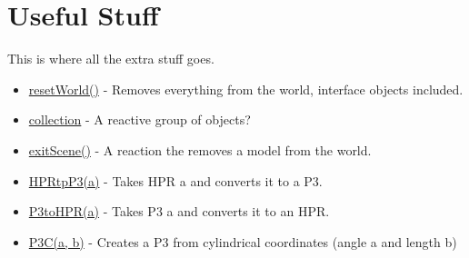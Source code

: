 \documentclass[10pt]{article}
\begin{document}
\section*{Useful Stuff}
This is where all the extra stuff goes.
\begin{itemize}
    \item \underline{resetWorld()} - Removes everything from the world, interface objects included.
    \item \underline{collection} - A reactive group of objects?
    \item \underline{exitScene()} - A reaction the removes a model from the world.
    \item \underline{HPRtpP3(a)} - Takes HPR a and converts it to a P3.
    \item \underline{P3toHPR(a)} - Takes P3 a and converts it to an HPR.
    \item \underline{P3C(a, b)} - Creates a P3 from cylindrical coordinates (angle a and length b)
\end{itemize}
\end{document}
